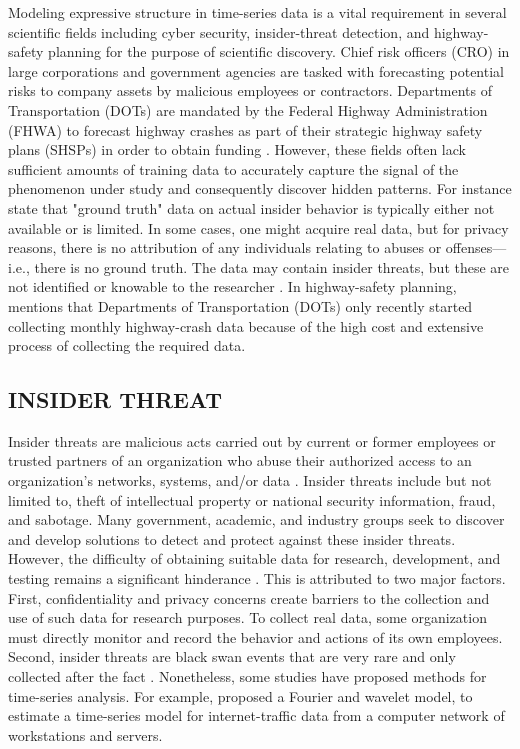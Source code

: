 \documentclass[letterpaper]{article}
\begin{document}
Modeling expressive structure in time-series data is a vital requirement in several scientific fields including cyber security, insider-threat detection, and highway-safety planning for the purpose of scientific discovery. Chief risk officers (CRO) in large corporations and government agencies are tasked with forecasting potential risks to company assets by malicious employees or contractors. Departments of Transportation (DOTs) are mandated by the Federal Highway Administration (FHWA) to forecast highway crashes as part of their strategic highway safety plans (SHSPs) in order to obtain funding \citep{smith2016hsip}. However, these fields often lack sufficient amounts of training data to accurately capture the signal of the phenomenon under study and consequently discover hidden patterns. For instance \cite{greitzer2013methods} state that "ground truth" data on actual insider behavior is typically either not available or is limited. In some cases, one might acquire real data, but for privacy reasons, there is no attribution of any individuals relating to abuses or offenses—i.e., there is no ground truth. The data may contain insider threats, but these are not identified or knowable to the researcher \citep{greitzer2013methods,gheyas2016detection}. In highway-safety planning, \cite{veeramisti2016business} mentions that Departments of Transportation (DOTs) only recently started collecting monthly highway-crash data because of the high cost and extensive process of collecting the required data.

\subsection{INSIDER THREAT}\label{insider-threat}

Insider threats are malicious acts carried out by current or former employees or trusted partners of an organization who abuse their authorized access to an organization's networks, systems, and/or data \citep{glasser2013bridging, lindauer2014generating}. Insider threats include but not limited to, theft of intellectual property or national security information, fraud, and sabotage. Many government, academic, and industry groups seek to discover and develop solutions to detect and protect against these insider threats. However, the difficulty of obtaining suitable data for research, development, and testing remains a significant hinderance \citep{glasser2013bridging}. This is attributed to two major factors. First, confidentiality and privacy concerns create barriers to the collection and use of such data for research purposes. To collect real data, some organization must directly monitor and record the behavior and actions of its own employees. Second, insider threats are black swan events that are very rare and only collected after the fact \citep{gheyas2016detection}. Nonetheless, some studies have proposed methods for time-series analysis. For example, \cite{stoffel2013finding} proposed a  Fourier and wavelet model, to estimate a time-series model for internet-traffic data from a computer network of workstations and servers.
\end{document}
